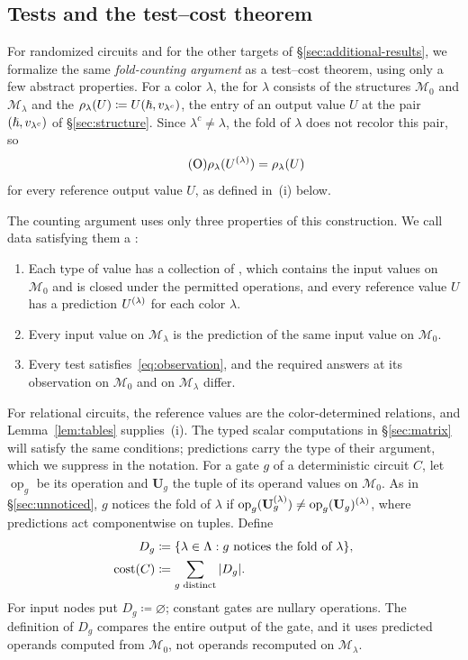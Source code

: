 \subsection{Tests and the test--cost theorem}\label{sec:simultaneous}
For randomized circuits and for the other targets of
\S\ref{sec:additional-results}, we formalize the same
\emph{fold-counting argument} as a test--cost theorem, using only a few
abstract properties. For a color $\lambda$,
the  for $\lambda$ consists of the structures $\mathcal M_0$
and $\mathcal M_\lambda$ and the 
$\rho_\lambda(U)\coloneqq U(\hslash,v_{\lambda^c})$, the entry of an output
value $U$ at the pair $(\hslash,v_{\lambda^c})$ of \S\ref{sec:structure}.
Since $\lambda^c\ne\lambda$, the fold of $\lambda$ does not recolor this
pair, so
\begin{equation*}\tag{O}\label{eq:observation}
 \rho_\lambda(U^{(\lambda)})=\rho_\lambda(U)
\end{equation*}
for every reference output value $U$, as defined in~(i) below.

The counting argument uses only three properties of this construction.
We call data satisfying them a :
\begin{enumerate}[label=(\roman*),leftmargin=*]
\item Each type of value has a collection of ,
which contains the input values on $\mathcal M_0$ and is closed under the
permitted operations, and every reference value $U$ has a prediction
$U^{(\lambda)}$ for each color $\lambda$.
\item Every input value on $\mathcal M_\lambda$ is the prediction of the
same input value on $\mathcal M_0$.
\item Every test satisfies~\eqref{eq:observation}, and the required
answers at its observation on $\mathcal M_0$ and on $\mathcal M_\lambda$
differ.
\end{enumerate}
For relational circuits, the reference values are the color-determined
relations, and Lemma~\ref{lem:tables} supplies~(i). The typed scalar
computations in \S\ref{sec:matrix} will satisfy the same conditions;
predictions carry the type of their argument, which we suppress in the
notation. For a gate $g$ of a deterministic circuit $C$, let
$\operatorname{op}_g$ be its operation and $\mathbf U_g$ the tuple of its
operand values on $\mathcal M_0$. As in \S\ref{sec:unnoticed}, $g$
notices the fold of $\lambda$ if
$\operatorname{op}_g(\mathbf U_g^{(\lambda)})\ne
\operatorname{op}_g(\mathbf U_g)^{(\lambda)}$, where predictions act
componentwise on tuples. Define
\[
 \begin{split}
 D_g&\coloneqq\{\lambda\in\Lambda:g\text{ notices the fold of }\lambda\},\\
 \operatorname{cost}(C)&\coloneqq\sum_{g\text{ distinct}}|D_g|.
 \end{split}
\]
For input nodes put $D_g\coloneqq\varnothing$; constant gates are nullary
operations. The definition of $D_g$ compares the entire output of the
gate, and it uses predicted operands computed from $\mathcal M_0$, not
operands recomputed on $\mathcal M_\lambda$.

